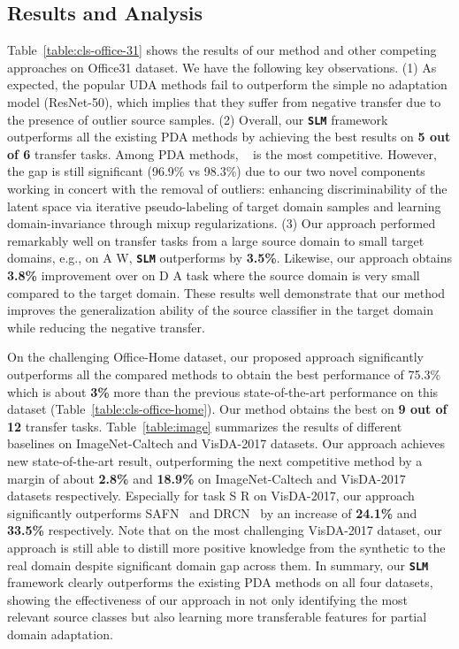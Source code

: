 \documentclass[10pt,twocolumn,letterpaper]{article}
\def\ours{\texttt{\textbf{SLM}}\xspace}
\begin{document}
\subsection{Results and Analysis}

Table~\ref{table:cls-office-31} shows the results of our method and other competing approaches on Office31 dataset. We have the following key observations.
(1) As expected, the popular UDA methods fail to outperform the simple no adaptation model (ResNet-50), which implies that they suffer from negative transfer due to the presence of outlier source samples.
(2) Overall, our \ours framework outperforms all the existing PDA methods by achieving the best results on \textbf{5 out of 6} transfer tasks. Among PDA methods, ~\cite{chen2020selective} is the most competitive.
However, the gap is still significant (96.9\% vs 98.3\%) due to our two novel components working in concert with the removal of outliers: enhancing discriminability of the latent space via iterative pseudo-labeling of target domain samples and learning domain-invariance through mixup regularizations.
(3) Our approach performed remarkably well on transfer tasks from a large source domain to small target domains, e.g., on A  W, \ours outperforms  by \textbf{3.5\%}.
Likewise, our approach obtains \textbf{3.8\%} improvement over  on D  A task where the source domain is very small compared to the target domain. These results well demonstrate that our method improves the generalization ability of the source classifier in the target domain while reducing the negative transfer.


On the challenging Office-Home dataset, our proposed approach significantly outperforms all the compared methods to obtain the best performance of 75.3\% which is about \textbf{3\%} more than the previous state-of-the-art performance on this dataset (Table~\ref{table:cls-office-home}).
Our method obtains the best on \textbf{9 out of 12} transfer tasks.
Table~\ref{table:image} summarizes the results of different baselines on ImageNet-Caltech and VisDA-2017 datasets. Our approach achieves new state-of-the-art result, outperforming the next competitive method by a margin of about \textbf{2.8\%} and \textbf{18.9\%} on ImageNet-Caltech and VisDA-2017 datasets respectively. Especially for task S  R on VisDA-2017, our approach significantly outperforms SAFN~\cite{xu2019larger} and DRCN~\cite{li2020deep} by an increase of \textbf{24.1\%} and \textbf{33.5\%} respectively. Note that on the most challenging VisDA-2017 dataset, our approach is still able to distill more positive knowledge from the synthetic to the real domain despite significant domain gap across them. In summary, our \ours framework clearly outperforms the existing PDA methods on all four datasets, showing the effectiveness of our approach in not only identifying the most relevant source classes but also learning more transferable features for partial domain adaptation.
\end{document}
